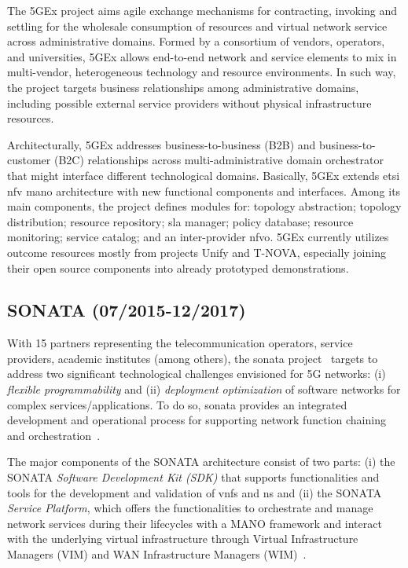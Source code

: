 The 5GEx project aims agile exchange mechanisms for contracting, invoking and settling for the wholesale consumption of resources and virtual network service across administrative domains. 
Formed by a consortium of vendors, operators, and universities, 5GEx allows end-to-end network and service elements to mix in multi-vendor, heterogeneous technology and resource environments.
In such way, the project targets business relationships among administrative domains, including possible external service providers without physical infrastructure resources.

Architecturally, 5GEx addresses business-to-business (B2B) and business-to-customer (B2C) relationships across multi-administrative domain orchestrator that might interface different technological domains. 
Basically, 5GEx extends \gls{etsi} \gls{nfv} \gls{mano} architecture with new functional components and interfaces.
Among its main components, the project defines modules for: topology abstraction; topology distribution; resource repository; \gls{sla} manager; policy database; resource monitoring; service catalog; and an inter-provider \gls{nfvo}.
5GEx currently utilizes outcome resources mostly from projects Unify and T-NOVA, especially joining their open source components into already prototyped demonstrations. 

\subsection{SONATA (07/2015-12/2017)}

With 15 partners representing the telecommunication operators, service providers, academic institutes (among others), the \gls{sonata} project~\cite{sonata} targets to address two significant technological challenges envisioned for 5G networks: (i) \textit{flexible programmability} and (ii) \textit{deployment optimization} of software networks for complex services/applications. To do so, \acrshort{sonata} provides an integrated development and operational process for supporting network function chaining and orchestration~\cite{karl2016devops}. 

The major components of the SONATA architecture consist of two parts: (i) the SONATA \textit{Software Development Kit (SDK)} that supports functionalities and tools for the development and validation of \glspl{vnf} and \gls{ns} and (ii) the SONATA \textit{Service Platform}, which offers the functionalities to orchestrate and manage network services during their lifecycles with a MANO framework and interact with the underlying virtual infrastructure through Virtual Infrastructure Managers (VIM) and WAN Infrastructure Managers (WIM)~\cite{Draxler2017SONATA:Networksb}.

